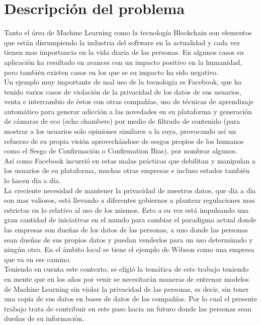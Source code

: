\documentclass[
11pt, %
oneside, %
spanish, %
singlespacing, %
headsepline, %
chapterinoneline, %
]{MastersDoctoralThesis} %
\begin{document}
\chapter{Descripci\'on del problema}

Tanto el área de Machine Learning como la tecnología Blockchain son elementos que están disrumpiendo la industria del software en la actualidad y cada vez tienen mas importancia en la vida diaria de las personas. En algunos casos su aplicación ha resultado en avances con un impacto positivo en la humanidad, pero también existen casos en los que se su impacto ha sido negativo. \\

Un ejemplo muy importante de mal uso de la tecnología es Facebook, que ha tenido varios casos de violación de la privacidad de los datos de sus usuarios, venta e intercambio de éstos con otras compañías, uso de técnicas de aprendizaje automático para generar adicción a las novedades en su plataforma y generación de cámaras de eco (echo chambers) por medio de filtrado de contenido (para mostrar a los usuarios solo opiniones similares a la suya, provocando así un refuerzo de su propia visión aprovechándose de sesgos propios de los humanos como el Sesgo de Confirmación o Confirmation Bias), por nombrar algunos. \\

Así como Facebook incurrió en estas malas prácticas que debilitan y manipulan a los usuarios de su plataforma, muchas otras empresas e incluso estados también lo hacen día a día. \\

La creciente necesidad de mantener la privacidad de nuestros datos, que día a día son mas valiosos, está llevando a diferentes gobiernos a plantear regulaciones mas estrictas en lo relativo al uso de los mismos.
Esto a su vez está impulsando una gran cantidad de iniciativas en el mundo para cambiar el paradigma actual donde las empresas son dueñas de los datos de las personas, a uno donde las personas sean dueñas de sus propios datos y puedan venderlos para un uso determinado y ningún otro. En el ámbito local se tiene el ejemplo de Wibson como una empresa que va en ese camino. \\

Teniendo en cuenta este contexto, se eligió la temática de este trabajo teniendo en mente que en los años por venir se necesitarán maneras de entrenar modelos de Machine Learning sin violar la privacidad de las personas, es decir, sin tener una copia de sus datos en bases de datos de las compañías. Por lo cual el presente trabajo trata de contribuir en este paso hacia un futuro donde las personas sean dueñas de su información. 
\end{document}
